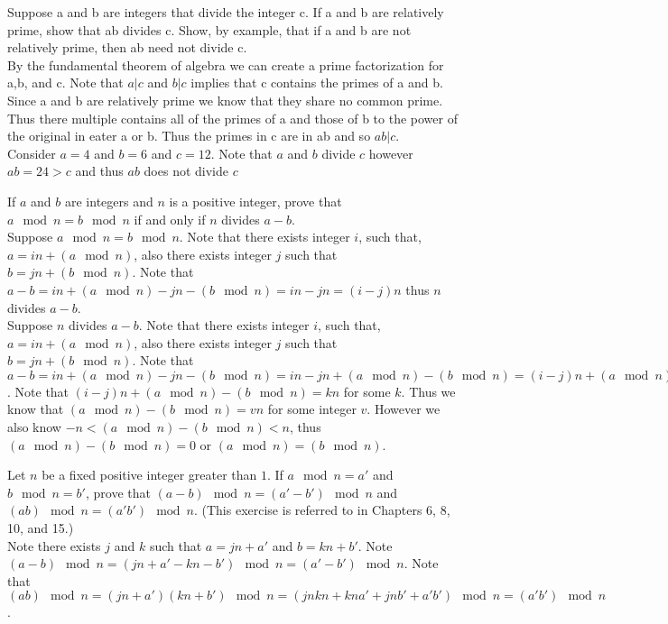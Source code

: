 \documentclass[12pt]{article}
\makeatletter
\theoremstyle{homework}
\newenvironment{exercise}[1]
{\def\@currentlabel{#1}\exercisecore}
{\endexercisecore}
\makeatother
\begin{document}
\begin{exercise}
6
Suppose a and b are integers that divide the integer c. If a and b are relatively prime, show that ab divides c. Show, by example, that if a and b are not relatively prime, then ab need not divide c.\\
By the fundamental theorem of algebra we can create a prime factorization for a,b, and c.  Note that $a | c$ and $b | c$ implies that c contains the primes of a and b.  Since a and b are relatively prime we know that they share no common prime.  Thus there multiple contains all of the primes of a and those of b to the power of the original in eater a or b.  Thus the primes in c are in ab and so $ab | c$.\\
Consider $a=4$ and $b=6$ and $c=12$.  Note that $a$ and $b$ divide $c$ however $ab=24>c$ and thus $ab$ does not divide $c$
\end{exercise}

\begin{exercise}
7
If $a$ and $b$ are integers and $n$ is a positive integer, prove that $a \mod n =b \mod n$ if and only if $n$ divides $a - b$.\\
Suppose $a \mod n =b \mod n$.  Note that there exists integer $i$, such that, $a=in+(a \mod n)$, also there exists integer $j$ such that $b=jn+(b \mod n)$.  Note that $a-b=in+(a \mod n)-jn-(b \mod n)=in-jn=(i-j)n$ thus $n$ divides $a - b$.\\
Suppose $n$ divides $a - b$.  Note that there exists integer $i$, such that, $a=in+(a \mod n)$, also there exists integer $j$ such that $b=jn+(b \mod n)$.  Note that $a-b=in+(a \mod n)-jn-(b \mod n)=in-jn+(a \mod n)-(b \mod n)=(i-j)n+(a \mod n)-(b \mod n)$.  Note that $(i-j)n+(a \mod n)-(b \mod n)=kn$ for some $k$.  Thus we know that $(a \mod n)-(b \mod n)=vn$ for some integer $v$.  However we also know $-n<(a \mod n)-(b \mod n)<n$, thus $(a \mod n)-(b \mod n)=0$ or $(a \mod n)=(b \mod n)$.
\end{exercise}

\begin{exercise}
9
Let $n$ be a fixed positive integer greater than $1$. If $a \mod n = a'$ and $b \mod n = b'$, prove that $(a - b) \mod n = (a' - b') \mod n$ and $(ab) \mod n = (a'b') \mod n$. (This exercise is referred to in Chapters 6, 8, 10, and 15.)\\
Note there exists $j$ and $k$ such that $a=jn+a'$ and $b=kn+b'$.  Note $(a - b) \mod n = (jn+a' - kn-b') \mod n = (a' - b') \mod n$.  Note that $(ab) \mod n = (jn+a')(kn+b') \mod n = (jnkn+kna'+jnb'+a'b') \mod n = (a'b') \mod n$.
\end{exercise}
\end{document}
